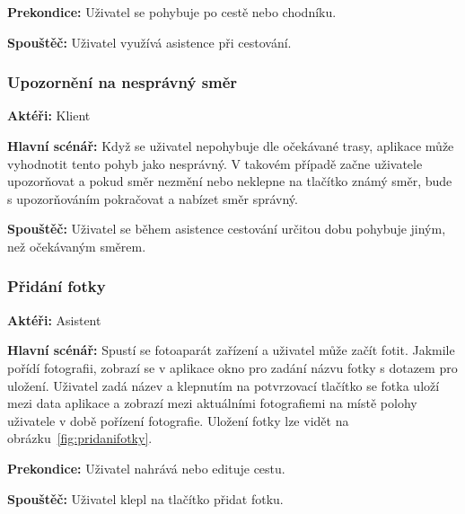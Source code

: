 \documentclass[czech,master,public,dept460,male,java,cpdeclaration]{diploma}
\newcommand{\usecase}[2]{\subsubsection{#1}\label{#2}}
\begin{document}
\vspace{0.1cm}
\noindent
\textbf{Prekondice:} Uživatel se pohybuje po cestě nebo chodníku.

\vspace{0.1cm}
\noindent
\textbf{Spouštěč:} Uživatel využívá asistence při cestování.


\usecase{Upozornění na nesprávný směr}{upozorneninespravnysmer}
\textbf{Aktéři:} Klient

\vspace{0.1cm}
\noindent
\textbf{Hlavní scénář:} Když se uživatel nepohybuje dle očekávané trasy, aplikace může vyhodnotit
tento pohyb jako nesprávný. V takovém případě začne uživatele upozorňovat a pokud směr nezmění nebo
neklepne na tlačítko známý směr, bude s upozorňováním pokračovat a nabízet směr správný.

\vspace{0.1cm}
\noindent
\textbf{Spouštěč:} Uživatel se během asistence cestování určitou dobu pohybuje jiným, než očekávaným směrem.


\usecase{Přidání fotky}{pridanifotky}
\textbf{Aktéři:} Asistent

\vspace{0.1cm}
\noindent
\textbf{Hlavní scénář:} Spustí se fotoaparát zařízení a uživatel může začít fotit. Jakmile pořídí
fotografii, zobrazí se v aplikace okno pro zadání názvu fotky s dotazem pro uložení. Uživatel zadá název
a klepnutím na potvrzovací tlačítko se fotka uloží mezi data aplikace a zobrazí mezi aktuálními fotografiemi
na místě polohy uživatele v době pořízení fotografie. Uložení fotky lze vidět na obrázku~\ref{fig:pridanifotky}.

\vspace{0.1cm}
\noindent
\textbf{Prekondice:} Uživatel nahrává nebo edituje cestu.

\vspace{0.1cm}
\noindent
\textbf{Spouštěč:} Uživatel klepl na tlačítko přidat fotku.
\end{document}
